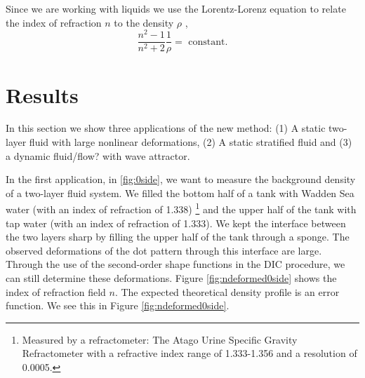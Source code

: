 \documentclass[smallextended]{svjour3}       %
\begin{document}
Since we are working with liquids we use the Lorentz-Lorenz equation to relate the index of refraction $n$ to the density $\rho$ \cite{lorentz1916theory, tan2015dependence},
\begin{equation}
 	\frac{n^2-1}{n^2+2} \frac{1}{\rho} = \mbox{ constant}.
\end{equation}

\section{Results}
In this section we show three applications of the new method: (1) A static two-layer fluid with large nonlinear deformations, (2) A static stratified fluid and (3) a dynamic fluid/flow? with wave attractor.

In the first application, in \ref{fig:0side}, we want to measure the background density of a two-layer fluid system. We filled the bottom half of a tank with Wadden Sea water (with an index of refraction of 1.338) \footnote{Measured by a refractometer: The Atago Urine Specific Gravity Refractometer with a refractive index range of 1.333-1.356 and a resolution of 0.0005.} and the upper half of the tank with tap water (with an index of refraction of 1.333). We kept the interface between the two layers sharp by filling the upper half of the tank through a sponge. The observed deformations of the dot pattern through this interface are large. Through the use of the second-order shape functions in the DIC procedure, we can still determine these deformations. Figure \ref{fig:ndeformed0side} shows the index of refraction field $n$. The expected theoretical density profile is an error function. We see this in Figure \ref{fig:ndeformed0side}.
\end{document}
